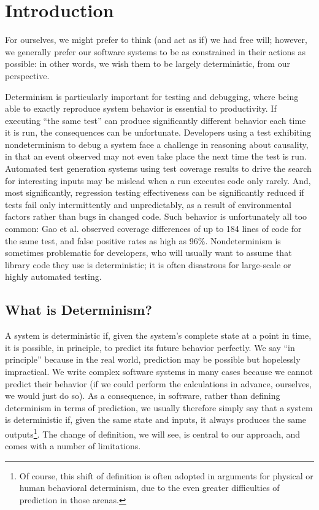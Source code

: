 \section{Introduction}

For ourselves, we might prefer to think (and act as if) we had free
will; however, we generally prefer our software systems to be as
constrained in their actions as possible:  in other words, we wish
them to be largely deterministic, from our perspective.

Determinism is particularly important for testing and debugging, where
being able to exactly reproduce system behavior is essential to
productivity.  If executing ``the same test'' can produce
significantly different behavior each time it is run, the consequences
can be unfortunate.  Developers using a test exhibiting nondeterminism
to debug a system
face a challenge in reasoning about causality, in that an event
observed may not even take place the next time the test is run.
Automated test generation systems using test coverage results to drive
the search for interesting inputs may be mislead when a run executes
code only rarely.  And, most significantly, regression testing
effectiveness can be significantly reduced if tests fail only
intermittently and unpredictably, as a result of environmental
factors rather than bugs in changed code.  Such behavior is
unfortunately all too common:  Gao et
al. \cite{Gao:2015:MSU:2818754.2818764} observed coverage differences
of up to 184 lines of code for the same test, and false positive rates
as high as 96\%.  Nondeterminism is sometimes problematic for
developers, who will usually want to  assume that library code they
use is deterministic; it is often disastrous for large-scale or highly
automated testing.


\subsection{What is Determinism?}

A system is deterministic if, given the system's complete state at a point in
time, it is possible, in principle, to predict its future behavior
perfectly.  We say ``in principle'' because in the real world,
prediction may be possible but hopelessly impractical.  We write
complex software systems in many cases because we cannot predict their
behavior (if we could perform the calculations in advance, ourselves,
we would just do so).  As a consequence, in software, rather than
defining determinism in terms of prediction, we usually therefore
simply say that a system is deterministic if, given the same state and
inputs, it always produces the same outputs\footnote{Of course, this
  shift of definition is often adopted in arguments for physical or
  human behavioral determinism, due to the even greater difficulties
  of prediction in those arenas.}.  The change of
definition, we will see, is central to our approach, and comes with a
number of limitations.

